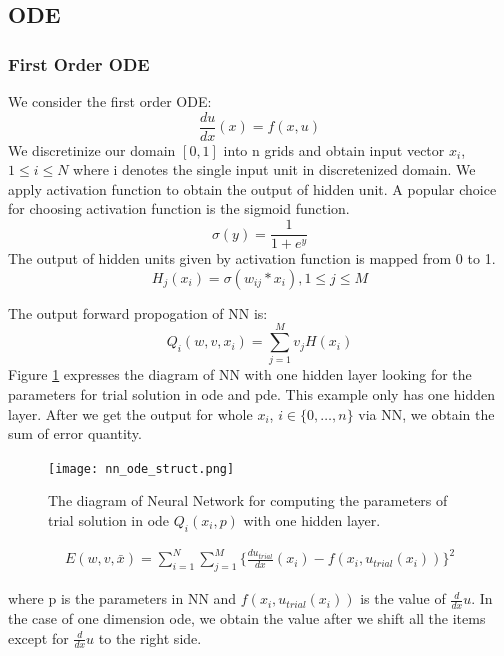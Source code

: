 \documentclass{article}
\begin{document}
\subsection{ODE}
\subsubsection{First Order ODE}
We consider the first order ODE:
\[\frac{du}{dx}(x)=f(x,u)\]
We discretinize our domain $[0,1]$ into n grids and obtain input vector $x_i$, $1 \leq i \leq N$ where i denotes the single input unit in discretenized domain.
We apply activation function to obtain the output of hidden unit. A popular choice for choosing activation function is the sigmoid function.
\begin{equation}\label{eq:sigmoid}
\sigma(y) = \frac{1}{1+e^{y}}
\end{equation}
The output of hidden units given by activation function is mapped from 0 to 1.
\begin{equation}\label{eq:hidden_unit}
H_{j}(x_i) =  \sigma (w_{ij}*x_i), 1 \leq j \leq M
\end{equation}

\medspace \noindent
The output forward propogation of NN is:
\begin{equation}\label{eq:output_ode}
Q_i (w,v,x_i)=  \sum_{j=1}^{M} \textit{v}_{j}H(x_i)
\end{equation}
\medspace \noindent
Figure \ref{fig:nn_ode_struct} expresses the diagram of NN with one hidden layer looking for the parameters for trial solution in ode and pde. This example only has one hidden layer. After we get the output for whole $x_{i}$, $i \in \{0, \dots , n\}$ via NN, we obtain the sum of error quantity.

\begin{figure}
	\centering
	\texttt{[image: nn\_ode\_struct.png]}
	\caption{The diagram of Neural Network for computing the parameters of trial solution in ode $Q_{i}(x_i,p)$ with one hidden layer. }
	\label{fig:nn_ode_struct}
\end{figure}

\begin{equation}\label{eq:total_error_ode}
\begin{aligned}
E(w,v,\bar{x})= \sum_{i=1}^{N}\sum_{j=1}^{M} \{ \frac{d u_{trial}}{dx}(x_i)-f(x_{i}, u_{trial}(x_i))\}^{2}
\end{aligned}
\end{equation}

\medskip \noindent
where p is the parameters in NN and $f(x_i,u_{trial}(x_i))$ is the value of $\frac{d}{dx}u$.
In the case of one dimension ode, we obtain the value after we shift all the items except for $\frac{d}{dx}u$ to the right side.
\end{document}
